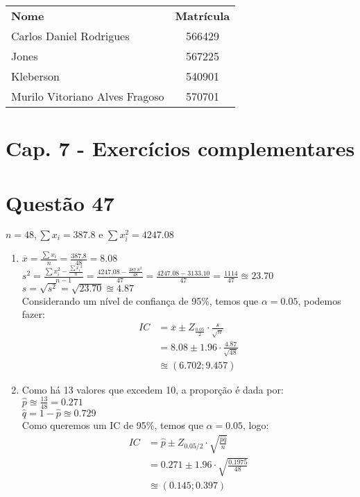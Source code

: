 \documentclass[12pt]{article}
\newcommand{\quest}[1]{\section*{Questão #1}} %
\begin{document}
\begin{table}[]
\centering
\begin{tabular}{lc}
\hline
\textbf{Nome}                  & \textbf{Matrícula} \\
Carlos Daniel Rodrigues        &  566429            \\
Jones                          &  567225            \\
Kleberson                      &  540901            \\
Murilo Vitoriano Alves Fragoso &  570701            \\ \hline
\end{tabular}
\end{table}

\section{Cap. 7 - Exercícios complementares}
\quest{47}
$n = 48, \sum{x_i}= 387.8 \text{ e } \sum{x_i^2=4247.08}$ 
\begin{enumerate}
    \item $\overline{x} = \frac{\sum{x_i}}{n} = \frac{387.8}{48} = 8.08$\\
          $s^2 = \frac{\sum{x_i^2} - \frac{\sum{x_i}^2}{n}}{n-1} = \frac{4247.08 - \frac{387.8^2}{48}}{47} = \frac{4247.08-3133.10}{47} = \frac{1114}{47} \approxeq 23.70$\\
          $s = \sqrt{s^2} = \sqrt{23.70} \approxeq 4.87$\\
          Considerando um nível de confiança de 95\%, temos que $\alpha = 0.05$, podemos fazer:
          \begin{align*}
              IC &= \overline{x} \pm Z_{\frac{0.05}{2}} \cdot \frac{s}{\sqrt{n}}\\
                 &= 8.08 \pm 1.96 \cdot \frac{4.87}{\sqrt{48}}\\
                 &\approxeq \left (6.702; 9.457 \right)
          \end{align*}
    \item Como há 13 valores que excedem 10, a proporção é dada por:\\
    $\hat{p} \approxeq \frac{13}{48} = 0.271$\\
    $\hat{q} = 1 - \hat{p} \approxeq 0.729$\\
    Como queremos um IC de 95\%, temos que $\alpha = 0.05$, logo:
    \begin{align*}
        IC &= \hat{p} \pm Z_{0.05/2} \cdot \sqrt{\frac{\hat{p}\hat{q}}{n}}\\
            &= 0.271 \pm 1.96 \cdot \sqrt{\frac{0.1975}{48}}\\
            &\approxeq (0.145;0.397)
    \end{align*}
\end{enumerate}
\end{document}
